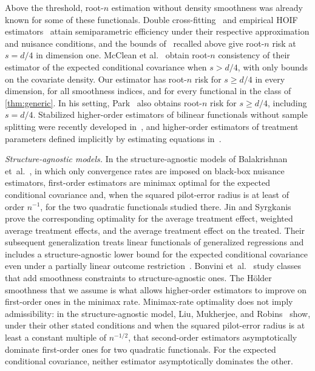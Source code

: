 Above the threshold, root-$n$ estimation without density smoothness was
already known for some of these functionals. Double
cross-fitting~\cite{neweyrobins} and empirical HOIF
estimators~\cite{liu} attain semiparametric efficiency under their
respective approximation and nuisance conditions, and the bounds
of~\cite[p.~380]{hoif2008} recalled above give root-$n$ risk at
$s=d/4$ in dimension one. McClean et al.~\cite[Section~4.2 and
Theorem~1]{mcclean} obtain root-$n$ consistency of their estimator of
the expected conditional covariance when $s>d/4$, with only bounds on
the covariate density. Our estimator has root-$n$ risk for
$s\ge d/4$ in every dimension, for all smoothness indices, and for
every functional in the class of \cref{thm:generic}. In his setting,
Park~\cite[Theorem~1]{park} also obtains root-$n$ risk for $s\ge d/4$,
including $s=d/4$. Stabilized
higher-order estimators of bilinear functionals without sample
splitting were recently developed in~\cite{stabilizedhoif}, and
higher-order estimators of treatment parameters defined implicitly by
estimating equations in~\cite{generalhoif}.

\emph{Structure-agnostic models.} In the structure-agnostic models of
Balakrishnan et~al.~\cite{structureagnostic}, in which only convergence
rates are imposed on black-box nuisance estimators, first-order
estimators are minimax optimal for the expected conditional covariance
and, when the squared pilot-error radius is at least of order $n^{-1}$,
for the two quadratic functionals studied there. Jin and
Syrgkanis~\cite{jinsyrgkanis2025} prove the corresponding optimality for
the average treatment effect, weighted average treatment effects, and
the average treatment effect on the treated. Their subsequent
generalization treats linear functionals of generalized regressions and
includes a structure-agnostic lower bound for the expected conditional
covariance even under a partially linear outcome
restriction~\cite[Theorems~6.1--6.2 and~7.5]{jinsyrgkanis2026general}. Bonvini
et~al.~\cite{bonvini2024smoothsa} study classes that add smoothness
constraints to structure-agnostic ones. The H\"older smoothness that we
assume is what allows higher-order estimators to improve on first-order
ones in the minimax rate. Minimax-rate optimality does not imply
admissibility: in the structure-agnostic model, Liu, Mukherjee, and
Robins~\cite[Theorems~0--2]{liumukherjeerobins2026} show, under their
other stated conditions and when the squared pilot-error radius is at
least a constant multiple of $n^{-1/2}$, that second-order estimators
asymptotically dominate first-order ones for two quadratic functionals.
For the expected conditional covariance, neither estimator
asymptotically dominates the other.

